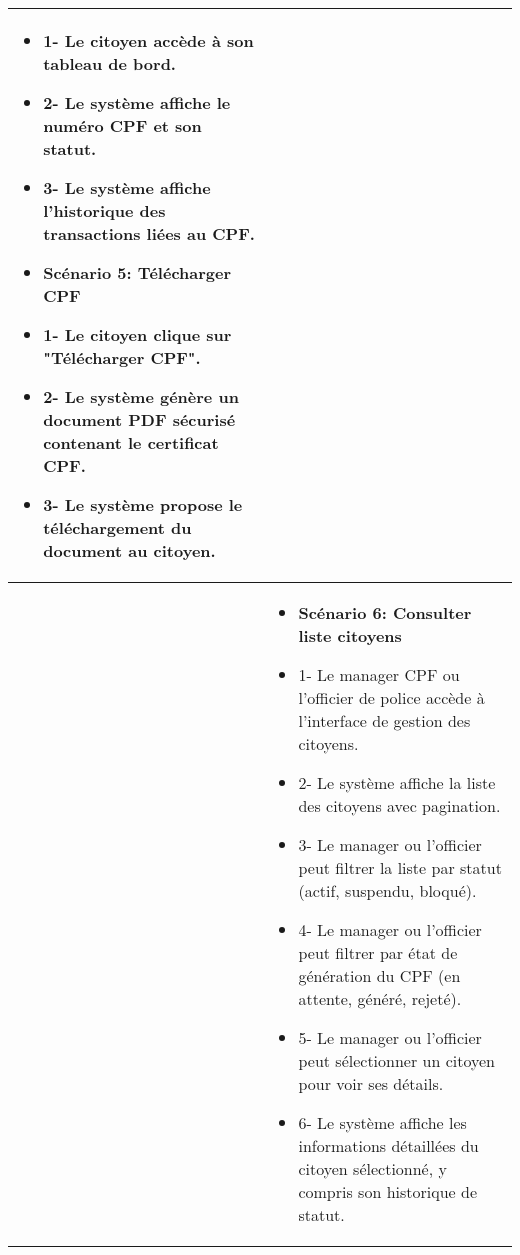 \begin{longtable}{|>{\arraybackslash}p{4.2cm}|>{\arraybackslash}p{12.5cm}|}
\begin{itemize}[label=]
 \item{1-} Le citoyen accède à son tableau de bord.
 \item{2-} Le système affiche le numéro CPF et son statut.
 \item{3-} Le système affiche l'historique des transactions liées au CPF.
 \item\textbf{Scénario 5: Télécharger CPF}
 \item{1-} Le citoyen clique sur "Télécharger CPF".
 \item{2-} Le système génère un document PDF sécurisé contenant le certificat CPF.
 \item{3-} Le système propose le téléchargement du document au citoyen.
\end{itemize}\\
\hline
\textbf{}&
\begin{itemize}[label=]
  \item\textbf{Scénario 6: Consulter liste citoyens}
 \item{1-} Le manager CPF ou l'officier de police accède à l'interface de gestion des citoyens.
 \item{2-} Le système affiche la liste des citoyens avec pagination.
 \item{3-} Le manager ou l'officier peut filtrer la liste par statut (actif, suspendu, bloqué).
 \item{4-} Le manager ou l'officier peut filtrer par état de génération du CPF (en attente, généré, rejeté).
 \item{5-} Le manager ou l'officier peut sélectionner un citoyen pour voir ses détails.
 \item{6-} Le système affiche les informations détaillées du citoyen sélectionné, y compris son historique de statut.
\end{itemize}\\


\end{longtable}
